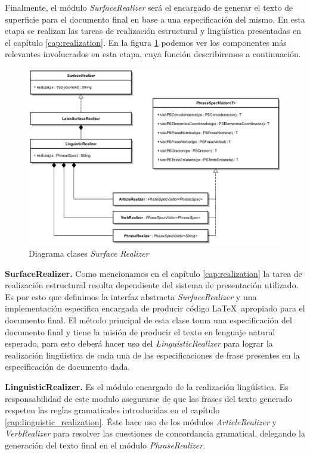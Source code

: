 Finalmente, el módulo \emph{SurfaceRealizer} será el encargado de generar el texto de superficie para el documento final en base a una especificación del mismo. En esta etapa se realizan las tareas de realización estructural y lingüística presentadas en el capítulo \ref{cap:realization}. En la figura \ref{fig:imp_surfrealizer} podemos ver los componentes más relevantes involucrados en esta etapa, cuya función describiremos a continuación. 

\begin{figure}[H]
  	\centering
	\includegraphics[scale=0.17]{img/realizer_imp.png}
	\caption{Diagrama clases \textit{Surface Realizer}}
  	\label{fig:imp_surfrealizer}
\end{figure}

\bigskip
\noindent
\textbf{SurfaceRealizer.} Como mencionamos en el capítulo \ref{cap:realization} la tarea de realización estructural resulta dependiente del sistema de presentación utilizado. Es por esto que definimos la interfaz abstracta \textit{SurfaceRealizer} y una implementación especifica encargada de producir código \LaTeX~apropiado para el documento final. El método principal de esta clase toma una especificación del documento final y tiene la misión de producir el texto en lenguaje natural esperado, para esto deberá hacer uso del \textit{LinguisticRealizer} para lograr la realización lingüística de cada una de las especificaciones de frase presentes en la especificación de documento dada. 


\bigskip
\noindent
\textbf{LinguisticRealizer.} Es el módulo encargado de la realización lingüística. Es responsabilidad de este modulo asegurarse de que las frases del texto generado respeten las reglas gramaticales introducidas en el capítulo \ref{cap:linguistic_realization}. Éste hace uso de los módulos \textit{ArticleRealizer} y \textit{VerbRealizer} para resolver las cuestiones de concordancia gramatical, delegando la generación del texto final en el módulo \textit{PhraseRealizer}. 

